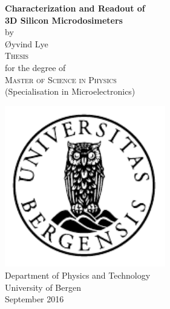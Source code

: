 \documentclass[12pt, a4paper]{report}
\begin{document}
\maketitle

\newcommand{\blankpage}{\newpage{}\thispagestyle{empty}\mbox{}\newpage{}}
\newcommand{\HRule}{\rule{\linewidth}{0.5mm}}


\blankpage %

\begin{titlepage}
\begin{center}
{ \Huge \bfseries Characterization and Readout of\\3D Silicon Microdosimeters}\\[1cm]

\large by\\ \Large Øyvind Lye\\[1.6cm]

\textsc{\Large Thesis}\\
\large for the degree of\\
\textsc{\Large Master of Science in Physics}\\[0.5cm]
\large (Specialisation in Microelectronics) \\[0.5cm]


\end{center}
\vfill
\begin{center}
{
	\includegraphics[width=7cm]{uib-emblem-svart}\\[0.5cm]
	
	\large {Department of Physics and Technology}\\
	\large {University of Bergen}\\[1cm]
	September 2016}
\end{center}
\end{titlepage}
\end{document}
